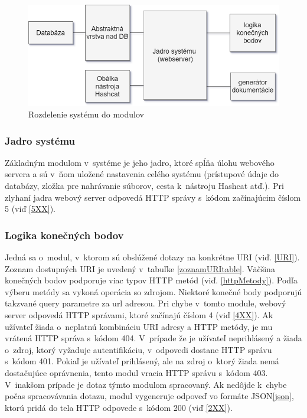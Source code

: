 \documentclass[slovak]{fitthesis}
\begin{document}
\begin{figure}[h]
    \centering
    \includegraphics[scale=0.6]{obrazky/moduly.png}
    \caption{Rozdelenie systému do modulov}
    \label{fig:moduly}
\end{figure}

\subsubsection{Jadro systému}
Základným modulom v~systéme je jeho jadro, ktoré spĺňa úlohu webového servera a sú v~ňom uložené nastavenia celého systému (prístupové údaje do databázy, zložka pre nahrávanie súborov, cesta k~nástroju Hashcat atď.). Pri zlyhaní jadra webový server odpovedá HTTP správy s~kódom začínajúcim číslom 5 (viď \ref{5XX}).


\subsubsection{Logika konečných bodov}
Jedná sa o~modul, v~ktorom sú obslúžené dotazy na konkrétne URI (viď. \ref{URI}). Zoznam dostupných URI je uvedený v~tabuľke \ref{zoznamURItable}. Väčšina konečných bodov podporuje viac typov HTTP metód (viď. \ref{httpMetody}). Podľa výberu metódy sa vykoná operácia so zdrojom. Niektoré konečné body podporujú takzvané query parametre za url adresou. Pri chybe v~tomto module, webový server odpovedá HTTP správami, ktoré začínajú číslom 4 (viď \ref{4XX}). Ak užívateľ žiada o~neplatnú kombináciu URI adresy a HTTP metódy, je mu vrátená HTTP správa s~kódom 404. V~prípade že je užívateľ neprihlásený a žiada o~zdroj, ktorý vyžaduje autentifikáciu, v~odpovedi dostane HTTP správu s~kódom 401. Pokiaľ je užívateľ prihlásený, ale na zdroj o~ktorý žiada nemá dostačujúce oprávnenia, tento modul vracia HTTP správu s~kódom 403. V~inakšom prípade je dotaz týmto modulom spracovaný. Ak nedôjde k~chybe počas spracovávania dotazu, modul vygeneruje odpoveď vo formáte JSON\ref{json}, ktorú pridá do tela HTTP odpovede s~kódom 200 (viď \ref{2XX}).
\end{document}
